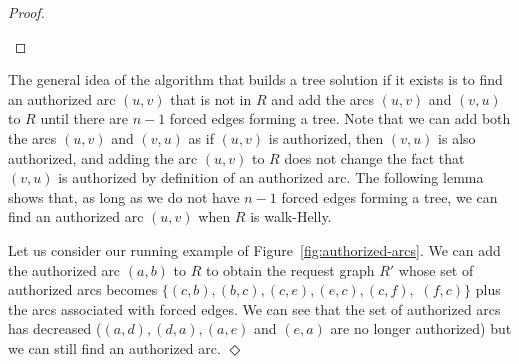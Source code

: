 \documentclass[11pt]{article}%
\begin{document}
\begin{proof}
\begin{itemize}
\end{itemize}
\end{proof}



The general idea of the algorithm that builds a tree solution if it exists is to find an authorized arc $(u,v)$ that is not in $R$ and add the arcs $(u,v)$ and $(v,u)$ to $R$ until there are $n-1$ forced edges forming a tree. Note that we can add both the arcs $(u,v)$ and $(v,u)$ as if $(u,v)$ is authorized, then $(v,u)$ is also authorized, and adding the arc $(u,v)$ to $R$ does not change the fact that $(v,u)$ is authorized by definition of an authorized arc. The following lemma shows that, as long as we do not have $n-1$ forced edges forming a tree, we can find an authorized arc $(u,v)$ when $R$ is walk-Helly. 

\begin{example} 
Let us consider our running example of Figure~\ref{fig:authorized-arcs}. We can add the authorized arc $(a,b)$ to $R$ to obtain the request graph $R'$ whose set of authorized arcs becomes $\{(c,b),(b,c),(c,e),(e,c),(c,f),$ $(f,c)\}$ plus the arcs associated with forced edges. We can see that the set of authorized arcs has decreased ($(a,d),(d,a),(a,e)$ and $(e,a)$ are no longer authorized) but we can still find an authorized arc. \hfill{} $\Diamond$
\end{example}
\end{document}
